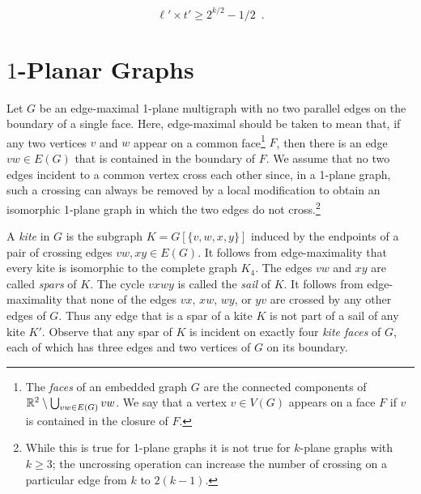 \documentclass{patmorin}
\begin{document}
\[
    \ell'\times t' \ge 2^{k/2}-1/2 \enspace .
\]   
\newpage
  
\section{$1$-Planar Graphs}

Let $G$ be an edge-maximal 1-plane multigraph with no two parallel edges on the boundary of a single face.  Here, edge-maximal should be taken to mean that, if any two vertices $v$ and $w$ appear on a common face\footnote{The \emph{faces} of an embedded graph $G$ are the connected components of $\mathbb{R}^2\setminus \bigcup_{vw\in E(G)} vw$.  We say that a vertex $v\in V(G)$ appears on a face $F$ if $v$ is contained in the closure of $F$.} $F$, then there is an edge $vw\in E(G)$ that is contained in the boundary of $F$.  We assume that no two edges incident to a common vertex cross each other since, in a 1-plane graph, such a crossing can always be removed by a local modification to obtain an isomorphic 1-plane graph in which the two edges do not cross.\footnote{While this is true for 1-plane graphs it is not true for $k$-plane graphs with $k\ge 3$; the uncrossing operation can increase the number of crossing on a particular edge from $k$ to $2(k-1)$.}

A \emph{kite} in $G$ is the subgraph $K=G[\{v,w,x,y\}]$ induced by the endpoints of a pair of crossing edges $vw,xy\in E(G)$.  It follows from edge-maximality that every kite is isomorphic to the complete graph $K_4$.
The edges $vw$ and $xy$ are called \emph{spars} of $K$.  The cycle $vxwy$ is called the \emph{sail} of $K$.  It follows from edge-maximality that none of the edges $vx$, $xw$, $wy$, or $yv$ are crossed by any other edges of $G$. Thus any edge that is a spar of a kite $K$ is not part of a sail of any kite $K'$. Observe that any spar of $K$ is incident on exactly four \emph{kite faces} of $G$, each of which has three edges and two vertices of $G$ on its boundary.
\end{document}
